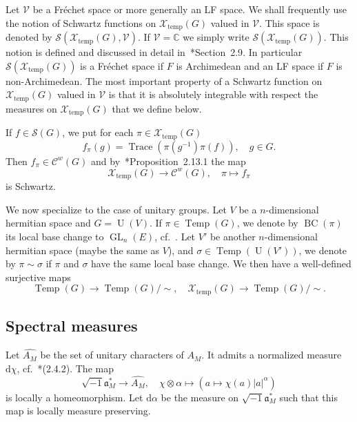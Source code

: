 \documentclass[letterpaper,11pt]{amsart}
\newcommand{\fa}{\mathfrak{a}}
\newcommand{\C}{\mathbb{C}}
\newcommand{\cC}{\mathcal{C}}
\newcommand{\cS}{\mathcal{S}}
\newcommand{\cV}{\mathcal{V}}
\newcommand{\cX}{\mathcal{X}}
\newcommand{\rd}{\mathrm{d}}
\newcommand{\<}{\negthickspace}
\providecommand{\abs}[1]{\lvert#1\rvert}
\DeclareMathOperator{\Trace}{Trace}
\DeclareMathOperator{\GL}{GL}
\DeclareMathOperator{\U}{U}
\DeclareMathOperator{\BC}{BC}
\DeclareMathOperator{\Temp}{Temp} \DeclareMathOperator{\temp}{temp}
\theoremstyle{definition}
\theoremstyle{plain}
\theoremstyle{remark}
\numberwithin{equation}{section}
\begin{document}
Let $\cV$ be a Fr\'{e}chet space or more generally an LF space.
We shall frequently use the notion of Schwartz
functions on $\cX_{\temp}(G)$ valued in $\cV$. This space is denoted by
$\cS(\cX_{\temp}(G), \cV)$. If $\cV = \C$ we simply write
$\cS(\cX_{\temp}(G))$. This notion is defined and discussed in detail
in~\cite{BP1}*{Section~2.9}. In particular $\cS(\cX_{\temp}(G))$ is a Fr\'{e}chet
space if $F$ is Archimedean and an LF space if $F$ is non-Archimedean. The
most important property of a Schwartz function on $\cX_{\temp}(G)$ valued in
$\cV$ is that it is absolutely integrable with respect the measures on
$\cX_{\temp}(G)$ that we define below.



If $f \in \cS(G)$, we put for each $\pi \in \cX_{\temp}(G)$
    \[
    f_{\pi}(g) = \Trace(\pi(g^{-1}) \pi(f)), \quad g \in G.
    \]
Then $f_{\pi} \in \cC^w(G)$ and by~\cite{BP1}*{Proposition~2.13.1} the map
    \begin{equation}    \label{eq:Temp_is_Schwartz}
    \cX_{\temp}(G) \to \cC^w(G), \quad \pi \mapsto f_{\pi}
    \end{equation}
is Schwartz.

We now specialize to the case of unitary groups. Let $V$ be a $n$-dimensional hermitian space and $G = \U(V)$. If $\pi \in \Temp(G)$, we denote by $\BC(\pi)$ its local base change to $\GL_{n}(E)$, cf.~\cites{Mok,KMSW}. Let $V'$ be another $n$-dimensional hermitian space (maybe the same as $V$), and $\sigma \in \Temp(\U(V'))$, we denote by $\pi \sim \sigma$ if $\pi$ and $\sigma$ have the same local base change. We then have a
well-defined surjective maps
    \[
    \Temp(G) \to \Temp(G)/ \sim, \quad \cX_{\temp}(G) \to \Temp(G)/\sim.
    \]


\subsection{Spectral measures}

Let $\widehat{A_{M}}$ be the set of unitary characters of $A_M$. It admits a
normalized measure $\rd \chi$, cf.~\cite{BP1}*{(2.4.2)}. The map
    \[
    \sqrt{-1} \fa_M^* \to \widehat{A_M}, \quad \chi \otimes \alpha \mapsto
    \left(a \mapsto \chi(a) \abs{a}^{\alpha} \right)
    \]
is locally a homeomorphism. Let $\rd \alpha$ be the measure on $\sqrt{-1}
\fa_M^*$ such that this map is locally measure preserving.
\end{document}
